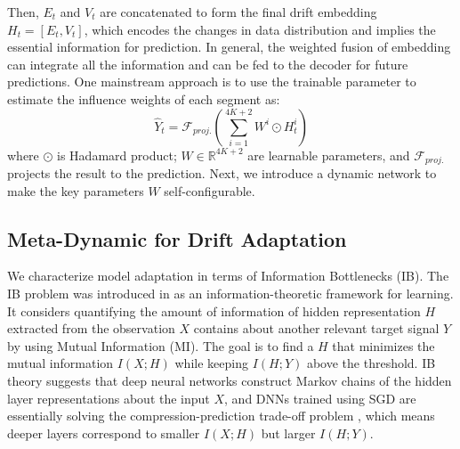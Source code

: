 \documentclass[sigconf]{acmart}
\begin{document}
Then, $\mathit{E}_t$ and $\mathit{V}_t$ are concatenated to form the final drift embedding $\mathit{H}_t=[\mathit{E}_t,\mathit{V}_t]$, which encodes the changes in data distribution and implies the essential information for prediction. In general, the weighted fusion of embedding can integrate all the information and can be fed to the decoder for future predictions. One mainstream approach \cite{zhang2017deep,yao2019revisiting,bai2020adaptive} is to use the trainable parameter to estimate the influence weights of each segment as: 
\begin{equation}
    \hat{Y}_t = \mathcal{F}_{proj.}(\sum_{i=1}^{4K+2}W^i\odot \mathit{H}_t^i)
\label{eq:fusion}
\end{equation}
where $\odot$ is Hadamard product; $W\in\mathbb{R}^{4K+2}$ are learnable parameters, and $\mathcal{F}_{proj.}$ projects the result to the prediction. Next, we introduce a dynamic network to make the key parameters $W$ self-configurable.

\subsection{Meta-Dynamic for Drift Adaptation}
We characterize model adaptation in terms of Information Bottlenecks (IB). The IB problem was introduced in \cite{tishby2000information} as an information-theoretic framework for learning. It considers quantifying the amount of information of hidden representation $H$ extracted from the observation $X$ contains about another relevant target signal $Y$ by using Mutual Information (MI). The goal is to find a $H$ that minimizes the mutual information $I(X;H)$ while keeping $I(H;Y)$ above the threshold. IB theory suggests that deep neural networks construct Markov chains of the hidden layer representations about the input $X$, and DNNs trained using SGD are essentially solving the compression-prediction trade-off problem \cite{goldfeld2020information}, which means deeper layers correspond to smaller $I(X;H)$ but larger $I(H;Y)$.
\end{document}
